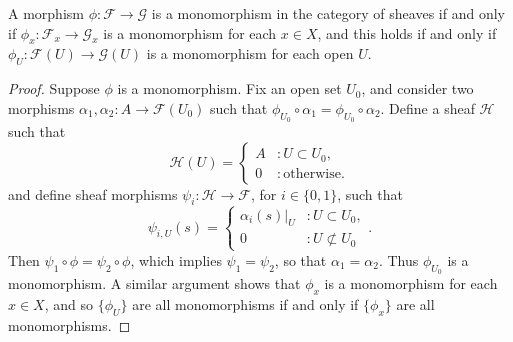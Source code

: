 \begin{lemma}
    A morphism $\phi: \mathcal{F} \to \mathcal{G}$ is a monomorphism in the category of sheaves if and only if $\phi_x: \mathcal{F}_x \to \mathcal{G}_x$ is a monomorphism for each $x \in X$, and this holds if and only if $\phi_U: \mathcal{F}(U) \to \mathcal{G}(U)$ is a monomorphism for each open $U$.
\end{lemma}
\begin{proof}
    Suppose $\phi$ is a monomorphism. Fix an open set $U_0$, and consider two morphisms $\alpha_1,\alpha_2: A \to \mathcal{F}(U_0)$ such that $\phi_{U_0} \circ \alpha_1 = \phi_{U_0} \circ \alpha_2$. Define a sheaf $\mathcal{H}$ such that
    \[ \mathcal{H}(U) = \begin{cases} A &: U \subset U_0, \\ 0 &: \text{otherwise}. \end{cases} \]
    and define sheaf morphisms $\psi_i: \mathcal{H} \to \mathcal{F}$, for $i \in \{ 0, 1 \}$, such that
    \[ \psi_{i,U}(s) = \begin{cases} \alpha_i(s)|_U &: U \subset U_0, \\ 0 &: U \not \subset U_0 \end{cases}. \]
    Then $\psi_1 \circ \phi = \psi_2 \circ \phi$, which implies $\psi_1 = \psi_2$, so that $\alpha_1 = \alpha_2$. Thus $\phi_{U_0}$ is a monomorphism. A similar argument shows that $\phi_x$ is a monomorphism for each $x \in X$, and so $\{ \phi_U \}$ are all monomorphisms if and only if $\{ \phi_x \}$ are all monomorphisms.

\end{proof}
